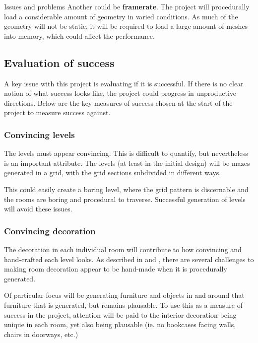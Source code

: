 \documentclass[progress]{cmpreport}
\begin{document}
\begin{section}{Issues and problems}
Another could be \textbf{framerate}. The project will procedurally load a considerable amount of geometry in varied conditions. As much of the geometry will not be static, it will be required to load a large amount of meshes into memory, which could affect the performance.  

\subsection{Evaluation of success} \label{evalsuccess}
A key issue with this project is evaluating if it is successful. If there is no clear notion of what success looks like, the project could progress in unproductive directions. Below are the key measures of success chosen at the start of the project to measure success against.

\subsubsection{Convincing levels}
The levels must appear convincing. This is difficult to quantify, but nevertheless is an important attribute. The levels (at least in the initial design) will be mazes generated in a grid, with the grid sections subdivided in different ways.

This could easily create a boring level, where the grid pattern is discernable and the rooms are boring and procedural to traverse. Successful generation of levels will avoid these issues.

\subsubsection{Convincing decoration}
The decoration in each individual room will contribute to how convincing and hand-crafted each level looks. As described in \cite{doi:10.1111/j.1467-8659.2009.01351.x} and \cite{taylor-parberry}, there are several challenges to making room decoration appear to be hand-made when it is procedurally generated. 

Of particular focus will be generating furniture and objects in and around that furniture that is generated, but remains plausable. To use this as a measure of success in the project, attention will be paid to the interior decoration being unique in each room, yet also being plausable (ie. no bookcases facing walls, chairs in doorways, etc.)



\end{section}
\end{document}
